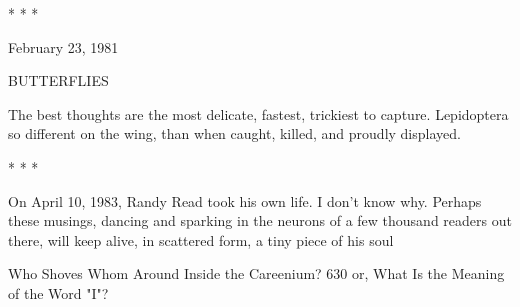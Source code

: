                                      *   *   *

                                                                   February 23, 1981

                                    BUTTERFLIES

                        The best thoughts are the most delicate,
                              fastest, trickiest to capture.
                         Lepidoptera so different on the wing,
                               than when caught, killed,
                                and proudly displayed.

                                     *   *   *

   On April 10, 1983, Randy Read took his own life. I don't know why. Perhaps these
musings, dancing and sparking in the neurons of a few thousand readers out there,
will keep alive, in scattered form, a tiny piece of his soul



Who Shoves Whom Around Inside the Careenium?                                         630
or, What Is the Meaning of the Word "I"?

